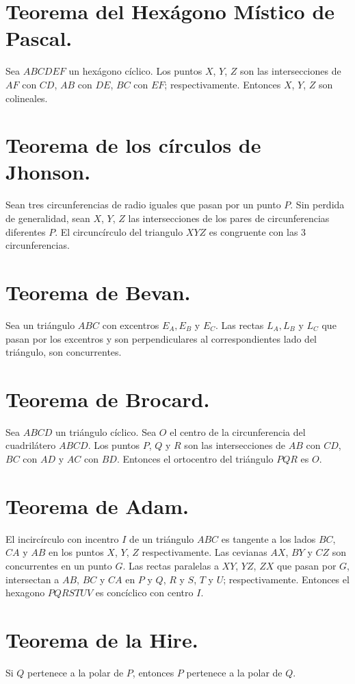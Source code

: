 \documentclass[12pt,a4paper,oneside]{book}
\begin{document}
\section{Teorema del Hexágono Místico de Pascal.}
Sea $ABCDEF$ un hexágono cíclico. Los puntos $X$, $Y$, $Z$ son las intersecciones de $AF$ con $CD$, $AB$ con $DE$, $BC$ con $EF$; respectivamente. Entonces $X$, $Y$, $Z$ son colineales.
\section{Teorema de los círculos de Jhonson.}
Sean tres circunferencias de radio iguales que pasan por un punto $P$. Sin perdida de generalidad, sean $X$, $Y$, $Z$ las intersecciones de los pares de circunferencias diferentes $P$. El circuncírculo del triangulo $XYZ$ es congruente con las 3 circunferencias.
\section{Teorema de Bevan.}
Sea un triángulo $ABC$ con excentros $E_A, E_B$ y $E_C$. Las rectas $L_A, L_B$ y $L_C$ que pasan por los excentros y son perpendiculares al correspondientes lado del triángulo, son concurrentes.
\section{Teorema de Brocard.}
Sea $ABCD$ un triángulo cíclico. Sea $O$ el centro de la circunferencia del cuadrilátero $ABCD$. Los puntos $P$, $Q$ y $R$ son las intersecciones de $AB$ con $CD$, $BC$ con $AD$ y $AC$ con $BD$. Entonces el ortocentro del triángulo $PQR$ es $O$. 
\section{Teorema de Adam.}
El incircírculo con incentro $I$ de un triángulo $ABC$ es tangente a los lados $BC$, $CA$ y $AB$ en los puntos $X$, $Y$, $Z$ respectivamente. Las cevianas  $AX$, $BY$ y $CZ$ son concurrentes en un punto $G.$ Las rectas paralelas a $XY$, $YZ$, $ZX$ que pasan por $G$, intersectan a $AB$, $BC$ y $CA$ en $P$ y $Q$, $R$ y $S$, $T$ y $U$; respectivamente. Entonces el hexagono $PQRSTUV$ es concíclico con centro $I$.
\section{Teorema de la Hire.}
Si $Q$ pertenece a la polar de $P$, entonces $P$ pertenece a la polar de $Q$.
\end{document}
